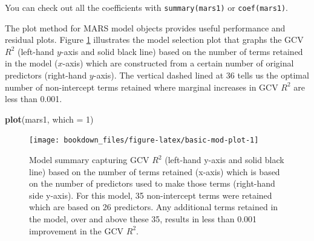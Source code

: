\documentclass[]{krantz}
\makeatletter
\newenvironment{Shaded}{\begin{snugshade}}{\end{snugshade}}
\newcommand{\CommentTok}[1]{\textcolor[rgb]{0.37,0.37,0.37}{\textit{#1}}}
\newcommand{\DataTypeTok}[1]{\textcolor[rgb]{0.27,0.27,0.27}{#1}}
\newcommand{\DecValTok}[1]{\textcolor[rgb]{0.06,0.06,0.06}{#1}}
\newcommand{\KeywordTok}[1]{\textcolor[rgb]{0.27,0.27,0.27}{\textbf{#1}}}
\newcommand{\NormalTok}[1]{#1}
\newcommand{\OperatorTok}[1]{\textcolor[rgb]{0.43,0.43,0.43}{\textbf{#1}}}
\newcommand{\StringTok}[1]{\textcolor[rgb]{0.5,0.5,0.5}{#1}}
\newenvironment{kframe}{%
\medskip{}
\setlength{\fboxsep}{.8em}
 \def\at@end@of@kframe{}%
 \ifinner\ifhmode%
  \def\at@end@of@kframe{\end{minipage}}%
  \begin{minipage}{\columnwidth}%
 \fi\fi%
 \def\FrameCommand##1{\hskip\@totalleftmargin \hskip-\fboxsep
 \colorbox{shadecolor}{##1}\hskip-\fboxsep
     \hskip-\linewidth \hskip-\@totalleftmargin \hskip\columnwidth}%
 \MakeFramed {\advance\hsize-\width
   \@totalleftmargin\z@ \linewidth\hsize
   \@setminipage}}%
 {\par\unskip\endMakeFramed%
 \at@end@of@kframe}
\newenvironment{block}[1]
  {
  \begin{itemize}
  \renewcommand{\labelitemi}{
    \raisebox{-.7\height}[0pt][0pt]{
      {\setkeys{Gin}{width=3em,keepaspectratio}\texttt{[image: icons/\#1]}}
    }
  }
  \setlength{\fboxsep}{1em}
  \begin{kframe}
  \item
  }
  {
  \end{kframe}
  \end{itemize}
  }
\newenvironment{tip}
  {\begin{block}{tip}}
  {\end{block}}
\renewenvironment{Shaded}{\begin{kframe}}{\end{kframe}}
\makeatother
\begin{document}
\begin{tip}
You can check out all the coefficients with \texttt{summary(mars1)} or
\texttt{coef(mars1)}.
\end{tip}

\begin{Shaded}
\end{Shaded}

The plot method for MARS model objects provides useful performance and residual plots. Figure \ref{fig:basic-mod-plot} illustrates the model selection plot that graphs the GCV \(R^2\) (left-hand \(y\)-axis and solid black line) based on the number of terms retained in the model (\(x\)-axis) which are constructed from a certain number of original predictors (right-hand \(y\)-axis). The vertical dashed lined at 36 tells us the optimal number of non-intercept terms retained where marginal increases in GCV \(R^2\) are less than 0.001.

\begin{Shaded}
\begin{Highlighting}[]
\KeywordTok{plot}\NormalTok{(mars1, }\DataTypeTok{which =} \DecValTok{1}\NormalTok{)}
\end{Highlighting}
\end{Shaded}

\begin{figure}

{\centering \texttt{[image: bookdown\_files/figure-latex/basic-mod-plot-1]} 

}

\caption{Model summary capturing GCV $R^2$ (left-hand y-axis and solid black line) based on the number of terms retained (x-axis) which is based on the number of predictors used to make those terms (right-hand side y-axis). For this model, 35 non-intercept terms were retained which are based on 26 predictors.  Any additional terms retained in the model, over and above these 35, results in less than 0.001 improvement in the GCV $R^2$.}\label{fig:basic-mod-plot}
\end{figure}
\end{document}
